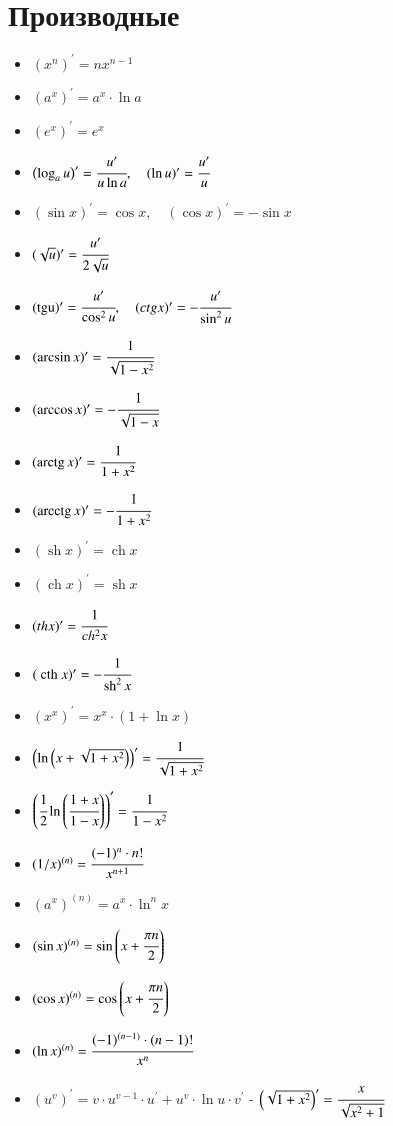 \documentclass[twoside, a4paperpt, fleqn]{extarticle}
\begin{document}
    \section*{Производные}
    \begin{multicols}{2}
        \begin{itemize}
            \item $\left(x^{n}\right)^{\prime}=n x^{n-1}$
            \item $\left(a^{x}\right)^{\prime}=a^{x} \cdot \ln a$
            \item $\left(e^{x}\right)^{\prime}=e^{x}$
            \item $\left(\log _{a} u\right)^{\prime}=\cfrac{u^{\prime}}{u \ln a}, \quad(\ln u)^{\prime}=\cfrac{u^{\prime}}{u}$
            \item $(\sin x)^{\prime}=\cos x, \quad(\cos x)^{\prime}=-\sin x$
            \item $(\sqrt{u})^{\prime}=\cfrac{u^{\prime}}{2 \sqrt{u}}$
            \item $(\operatorname{tgu})^{\prime}=\cfrac{u^{\prime}}{\cos ^{2} u}, \quad(c t g x)^{\prime}=-\cfrac{u^{\prime}}{\sin ^{2} u}$
            \item $(\arcsin x)^{\prime}=\cfrac{1}{\sqrt{1-x^{2}}}$
            \item $(\arccos x)^{\prime}=-\cfrac{1}{\sqrt{1-x}}$
            \item $(\operatorname{arctg} x)^{\prime}=\cfrac{1}{1+x^{2}}$
            \item $(\operatorname{arcctg} x)^{\prime}=-\cfrac{1}{1+x^{2}}$
            \item $(\operatorname{sh} x)^{\prime}=\operatorname{ch} x$
            \item $(\operatorname{ch} x)^{\prime}=\operatorname{sh} x$
            \item $(t h x)^{\prime}=\cfrac{1}{c h^{2} x}$
            \item $(\text { cth } x)^{\prime}=-\cfrac{1}{\operatorname{sh}^{2} x}$
            \item $\left(x^{x}\right)^{\prime}=x^{x} \cdot(1+\ln x)$
            \item $\left(\ln \left(x+\sqrt{1+x^{2}}\right)\right)^{\prime}=\cfrac{1}{\sqrt{1+x^{2}}}$
            \item $\left(\cfrac{1}{2} \ln \left(\cfrac{1+x}{1-x}\right)\right)^{\prime}=\cfrac{1}{1-x^{2}}$
            \item $(1 / x)^{(n)}=\cfrac{(-1)^{n} \cdot n !}{x^{n+1}}$
            \item $\left(a^{x}\right)^{(n)}=a^{x} \cdot \ln ^{n} x$
            \item $(\sin x)^{(n)}=\sin \left(x+\cfrac{\pi n}{2}\right)$
            \item $(\cos x)^{(n)}=\cos \left(x+\cfrac{\pi n}{2}\right)$
            \item $(\ln x)^{(n)}=\cfrac{(-1)^{(n-1)} \cdot(n-1) !}{x^{n}}$
        \end{itemize}
    \end{multicols}
    \begin{itemize}
        \item $\left(u^{v}\right)^{\prime}=v \cdot u^{v-1} \cdot u^{\prime}+u^{v} \cdot \ln u \cdot v^{\prime}$ - $\left(\sqrt{1+x^{2}}\right)^{\prime}=\cfrac{x}{\sqrt{x^{2}+1}}$
    \end{itemize}
\end{document}
